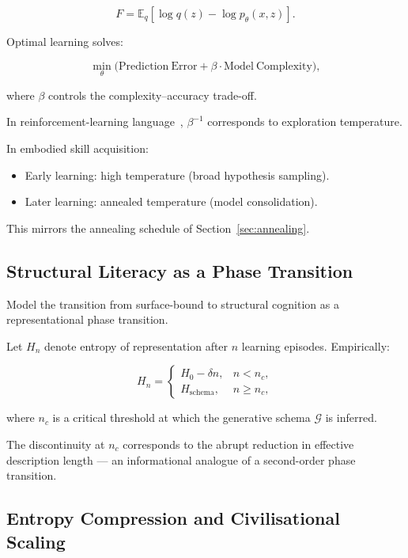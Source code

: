 \documentclass[12pt,a4paper]{article}
\theoremstyle{definition}
\begin{document}
\begin{equation}
  F = \mathbb{E}_q[\log q(z) - \log p_\theta(x,z)].
\end{equation}

Optimal learning solves:

\begin{equation}
  \min_\theta
  \Big(
    \mathrm{Prediction\ Error}
    + \beta \cdot \mathrm{Model\ Complexity}
  \Big),
\end{equation}

where $\beta$ controls the complexity–accuracy trade-off.

In reinforcement-learning language~\citep{sutton2018}, $\beta^{-1}$
corresponds to exploration temperature.

In embodied skill acquisition:

\begin{itemize}
  \item Early learning: high temperature (broad hypothesis sampling).
  \item Later learning: annealed temperature (model consolidation).
\end{itemize}

This mirrors the annealing schedule of Section~\ref{sec:annealing}.

\subsection{Structural Literacy as a Phase Transition}

Model the transition from surface-bound to structural cognition as a
representational phase transition.

Let $H_n$ denote entropy of representation after $n$ learning episodes.
Empirically:

\begin{equation}
  H_n =
  \begin{cases}
    H_0 - \delta n, & n < n_c, \\
    H_{\mathrm{schema}}, & n \geq n_c,
  \end{cases}
\end{equation}

where $n_c$ is a critical threshold at which the generative schema
$\mathcal{G}$ is inferred.

The discontinuity at $n_c$ corresponds to the abrupt reduction in effective
description length — an informational analogue of a second-order phase transition.

\subsection{Entropy Compression and Civilisational Scaling}
\end{document}
